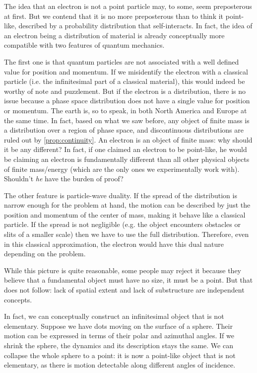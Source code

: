\documentclass[smallextended]{svjour3}
\numberwithin{equation}{section}
\theoremstyle{definition}
\begin{document}
The idea that an electron is not a point particle may, to some, seem preposterous at first. But we contend that it is no more preposterous than to think it point-like, described by a probability distribution that self-interacts. In fact, the idea of an electron being a distribution of material is already conceptually more compatible with two features of quantum mechanics.

The first one is that quantum particles are not associated with a well defined value for position and momentum. If we misidentify the electron with a classical particle (i.e. the infinitesimal part of a classical material), this would indeed be worthy of note and puzzlement. But if the electron is a distribution, there is no issue because a phase space distribution does not have a single value for position or momentum. The earth is, so to speak, in both North America and Europe at the same time. In fact, based on what we saw before, any object of finite mass is a distribution over a region of phase space, and discontinuous distributions are ruled out by \ref{prop:continuity}. An electron is an object of finite mass: why should it be any different? In fact, if one claimed an electron to be point-like, he would be claiming an electron is fundamentally different than all other physical objects of finite mass/energy (which are the only ones we experimentally work with). Shouldn't \emph{he} have the burden of proof?

The other feature is particle-wave duality. If the spread of the distribution is narrow enough for the problem at hand, the motion can be described by just the position and momentum of the center of mass, making it behave like a classical particle. If the spread is not negligible (e.g. the object encounters obstacles or slits of a smaller scale) then we have to use the full distribution. Therefore, even in this classical approximation, the electron would have this dual nature depending on the problem.

While this picture is quite reasonable, some people may reject it because they believe that a fundamental object must have no size, it must be a point. But that does not follow: lack of spatial extent and lack of substructure are independent concepts.

In fact, we can conceptually construct an infinitesimal object that is not elementary. Suppose we have dots moving on the surface of a sphere. Their motion can be expressed in terms of their polar and azimuthal angles. If we shrink the sphere, the dynamics and its description stays the same. We can collapse the whole sphere to a point: it is now a point-like object that is not elementary, as there is motion detectable along different angles of incidence.
\end{document}
